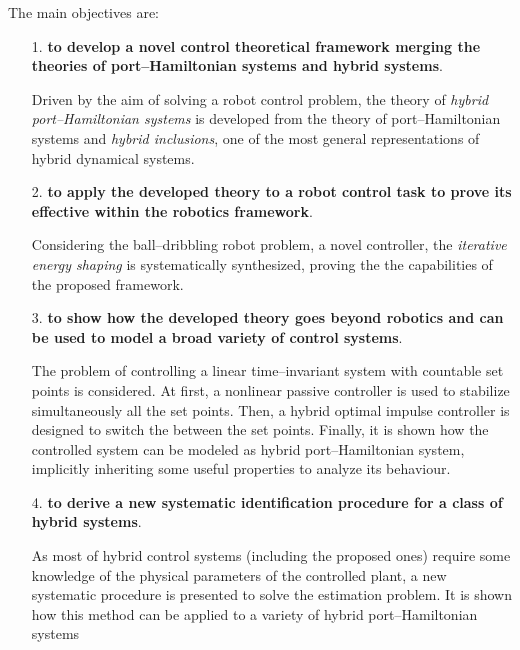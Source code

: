 The main objectives are:
%
\begin{itemize}
    \item [1.] \textbf{to develop a novel control theoretical framework merging the theories of port--Hamiltonian systems and hybrid systems}.
    
    Driven by the aim of solving a robot control problem, the theory of \textit{hybrid port--Hamiltonian systems} is developed from the theory of port--Hamiltonian systems and \textit{hybrid inclusions}, one of the most general representations of hybrid dynamical systems.
    \item [2.] \textbf{to apply the developed theory to a robot control task to prove its effective within the robotics framework}. 
    
    Considering the ball--dribbling robot problem, a novel controller, the \textit{iterative energy shaping} is systematically synthesized, proving the the capabilities of the proposed framework.
    \item [3.] \textbf{to show how the developed theory goes beyond robotics and can be used to model a broad variety of control systems}. 
    
    The problem of controlling a linear time--invariant system with countable set points is considered. At first, a nonlinear passive controller is used to stabilize simultaneously all the set points. Then, a hybrid optimal impulse controller is designed to switch the between the set points. Finally, it is shown how the controlled system can be modeled as hybrid port--Hamiltonian system, implicitly inheriting some useful properties to analyze its behaviour.
    
    \item[4.] \textbf{to derive a new systematic identification procedure for a class of hybrid systems}.
    
    As most of hybrid control systems (including the proposed ones) require some knowledge of the physical parameters of the controlled plant, a new systematic procedure is presented to solve the estimation problem. It is shown how this method can be applied to a variety of hybrid port--Hamiltonian systems 
    
    \end{itemize}
%





%
\clearpage

